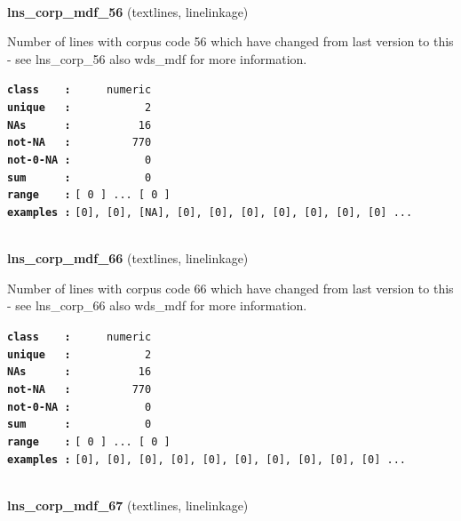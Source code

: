 \documentclass[]{article}
\begin{document}
~

\textbf{lns\_corp\_mdf\_56} (textlines, linelinkage)

Number of lines with corpus code 56 which have changed from last version
to this - see lns\_corp\_56 also wds\_mdf for more information.

\textbf{\texttt{class\ \ \ \ :}} \texttt{~~~~~numeric}\\
\textbf{\texttt{unique\ \ \ :}} \texttt{~~~~~~~~~~~2}\\
\textbf{\texttt{NAs\ \ \ \ \ \ :}} \texttt{~~~~~~~~~~16}\\
\textbf{\texttt{not-NA\ \ \ :}} \texttt{~~~~~~~~~770}\\
\textbf{\texttt{not-0-NA\ :}} \texttt{~~~~~~~~~~~0}\\
\textbf{\texttt{sum\ \ \ \ \ \ :}} \texttt{~~~~~~~~~~~0}\\
\textbf{\texttt{range\ \ \ \ :}}
\texttt{{[}\ 0\ {]}\ ...\ {[}\ 0\ {]}}\\
\textbf{\texttt{examples\ :}}
\texttt{{[}0{]},\ {[}0{]},\ {[}NA{]},\ {[}0{]},\ {[}0{]},\ {[}0{]},\ {[}0{]},\ {[}0{]},\ {[}0{]},\ {[}0{]}\ ...}\\

~

\textbf{lns\_corp\_mdf\_66} (textlines, linelinkage)

Number of lines with corpus code 66 which have changed from last version
to this - see lns\_corp\_66 also wds\_mdf for more information.

\textbf{\texttt{class\ \ \ \ :}} \texttt{~~~~~numeric}\\
\textbf{\texttt{unique\ \ \ :}} \texttt{~~~~~~~~~~~2}\\
\textbf{\texttt{NAs\ \ \ \ \ \ :}} \texttt{~~~~~~~~~~16}\\
\textbf{\texttt{not-NA\ \ \ :}} \texttt{~~~~~~~~~770}\\
\textbf{\texttt{not-0-NA\ :}} \texttt{~~~~~~~~~~~0}\\
\textbf{\texttt{sum\ \ \ \ \ \ :}} \texttt{~~~~~~~~~~~0}\\
\textbf{\texttt{range\ \ \ \ :}}
\texttt{{[}\ 0\ {]}\ ...\ {[}\ 0\ {]}}\\
\textbf{\texttt{examples\ :}}
\texttt{{[}0{]},\ {[}0{]},\ {[}0{]},\ {[}0{]},\ {[}0{]},\ {[}0{]},\ {[}0{]},\ {[}0{]},\ {[}0{]},\ {[}0{]}\ ...}\\

~

\textbf{lns\_corp\_mdf\_67} (textlines, linelinkage)
\end{document}
